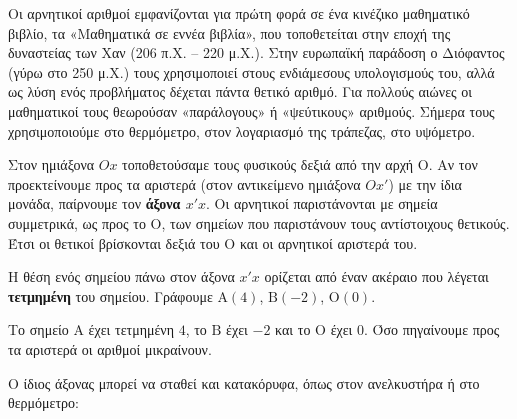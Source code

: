 
Οι αρνητικοί αριθμοί εμφανίζονται για πρώτη φορά σε ένα κινέζικο μαθηματικό βιβλίο, τα «Μαθηματικά σε εννέα βιβλία», που τοποθετείται στην εποχή της δυναστείας των Χαν (206 π.Χ. -- 220 μ.Χ.). Στην ευρωπαϊκή παράδοση ο Διόφαντος (γύρω στο 250 μ.Χ.) τους χρησιμοποιεί στους ενδιάμεσους υπολογισμούς του, αλλά ως λύση ενός προβλήματος δέχεται πάντα θετικό αριθμό. Για πολλούς αιώνες οι μαθηματικοί τους θεωρούσαν «παράλογους» ή «ψεύτικους» αριθμούς. Σήμερα τους χρησιμοποιούμε στο θερμόμετρο, στον λογαριασμό της τράπεζας, στο υψόμετρο.


Στον ημιάξονα $Ox$ τοποθετούσαμε τους φυσικούς δεξιά από την αρχή $\mathrm{Ο}$. Αν τον προεκτείνουμε προς τα αριστερά (στον αντικείμενο ημιάξονα $Ox'$) με την ίδια μονάδα, παίρνουμε τον \textbf{άξονα $x'x$}. Οι αρνητικοί παριστάνονται με σημεία συμμετρικά, ως προς το $\mathrm{Ο}$, των σημείων που παριστάνουν τους αντίστοιχους θετικούς. Έτσι οι θετικοί βρίσκονται δεξιά του $\mathrm{Ο}$ και οι αρνητικοί αριστερά του.

\begin{center}
\end{center}

Η θέση ενός σημείου πάνω στον άξονα $x'x$ ορίζεται από έναν ακέραιο που λέγεται \textbf{τετμημένη} του σημείου. Γράφουμε $\mathrm{Α}(4)$, $\mathrm{Β}(-2)$, $\mathrm{Ο}(0)$.

\begin{center}
\end{center}

Το σημείο $\mathrm{Α}$ έχει τετμημένη $4$, το $\mathrm{Β}$ έχει $-2$ και το $\mathrm{Ο}$ έχει $0$. Όσο πηγαίνουμε προς τα αριστερά οι αριθμοί μικραίνουν.

Ο ίδιος άξονας μπορεί να σταθεί και κατακόρυφα, όπως στον ανελκυστήρα ή στο θερμόμετρο:

\begin{center}
\end{center}

